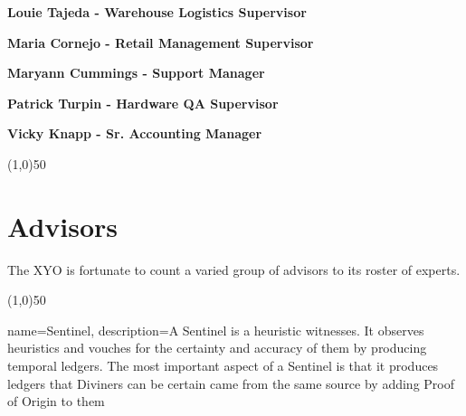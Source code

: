 \documentclass{article}
\begin{document}
\begin {framed}
\begin {center}
\textbf{Louie Tajeda - Warehouse Logistics Supervisor}
\end {center}
\end {framed}

\begin {framed}
\begin {center}
\textbf{Maria Cornejo - Retail Management Supervisor}
\end {center}
\end {framed}

\begin {framed}
\begin {center}
\textbf{Maryann Cummings - Support Manager}
\end {center}
\end {framed}

\begin {framed}
\begin {center}
\textbf{Patrick Turpin - Hardware QA Supervisor}
\end {center}
\end {framed}

\begin {framed}
\begin {center}
\textbf{Vicky Knapp - Sr. Accounting Manager}
\end {center}
\end {framed}

\begin{center}
\line(1,0){50}
\end{center}

\section {Advisors}
The \Gls{XYO} is fortunate to count a varied group of advisors to its roster of experts.

\begin{center}
\line(1,0){50}
\end{center}

\clearpage



{
    name={Sentinel},
    description={A Sentinel is a heuristic witnesses. It observes heuristics and vouches for the certainty and accuracy of them by producing temporal ledgers. The most important aspect of a Sentinel is that it produces ledgers that Diviners can be certain came from the same source by adding Proof of Origin to them}
}
\end{document}
